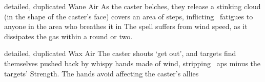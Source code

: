 \ifodd\value{diceNo}
  {detailed, duplicated}%
  {Wane}%
  {Air}%
  {}%
  {As the caster belches, they release a stinking cloud (in the shape of the caster's face) covers an area of  \glspl{step}, inflicting ~\glspl{fatigue} to anyone in the area who breathes it in}%
  {
    The spell suffers from wind speed, as it dissipates the gas within a round or two.
  }

\else

  {detailed, duplicated}%
  {Wax}%
  {Air}%
  {}%
  {The caster shouts `get out', and  targets find themselves pushed back by whispy hands made of wind, stripping ~\glspl{ap} minus the targets' Strength.
  The hands avoid affecting the caster's allies}%
  {}

\fi
{}
